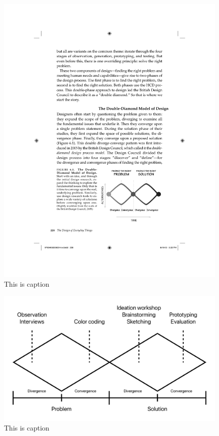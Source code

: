 \begin{figure}
\hypertarget{fig:norman_double_diamond}{%
\centering
\includegraphics[width=1\textwidth,height=\textheight]{./figures/norman_double_diamond.pdf}
\caption{This is caption}\label{fig:norman_double_diamond}
}
\end{figure}

\begin{figure}
\hypertarget{fig:double_diamond}{%
\centering
\includegraphics[width=1\textwidth,height=\textheight]{./figures/double_diamond.pdf}
\caption{This is caption}\label{fig:double_diamond}
}
\end{figure}


